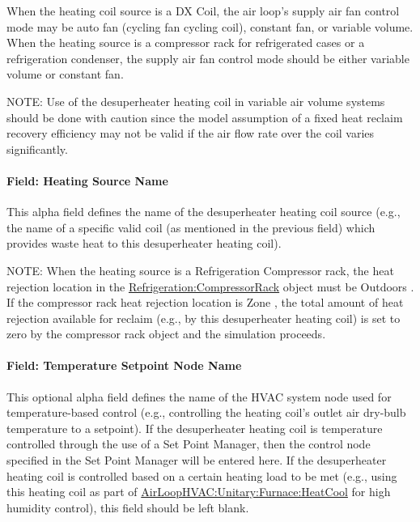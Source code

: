 When the heating coil source is a DX Coil, the air loop's supply air fan control mode may be auto fan (cycling fan cycling coil), constant fan, or variable volume. When the heating source is a compressor rack for refrigerated cases or a refrigeration condenser, the supply air fan control mode should be either variable volume or constant fan.

NOTE: Use of the desuperheater heating coil in variable air volume systems should be done with caution since the model assumption of a fixed heat reclaim recovery efficiency may not be valid if the air flow rate over the coil varies significantly.

\paragraph{Field: Heating Source Name}\label{field-heating-source-name}

This alpha field defines the name of the desuperheater heating coil source (e.g., the name of a specific valid coil (as mentioned in the previous field) which provides waste heat to this desuperheater heating coil).

NOTE: When the heating source is a Refrigeration Compressor rack, the heat rejection location in the \hyperref[refrigerationcompressorrack]{Refrigeration:CompressorRack} object must be Outdoors . If the compressor rack heat rejection location is Zone , the total amount of heat rejection available for reclaim (e.g., by this desuperheater heating coil) is set to zero by the compressor rack object and the simulation proceeds.

\paragraph{Field: Temperature Setpoint Node Name}\label{field-temperature-setpoint-node-name-3}

This optional alpha field defines the name of the HVAC system node used for temperature-based control (e.g., controlling the heating coil's outlet air dry-bulb temperature to a setpoint). If the desuperheater heating coil is temperature controlled through the use of a Set Point Manager, then the control node specified in the Set Point Manager will be entered here. If the desuperheater heating coil is controlled based on a certain heating load to be met (e.g., using this heating coil as part of \hyperref[airloophvacunitaryfurnaceheatcool]{AirLoopHVAC:Unitary:Furnace:HeatCool} for high humidity control), this field should be left blank.

